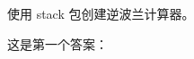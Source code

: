 \begin{Exercise}[title={计算器},difficulty=7]
\label{ex:calc}
\Question\label{ex:calc q1} 使用 stack 包创建逆波兰计算器。

\end{Exercise}

\begin{Answer}
\Question 这是第一个答案：

\end{Answer}
